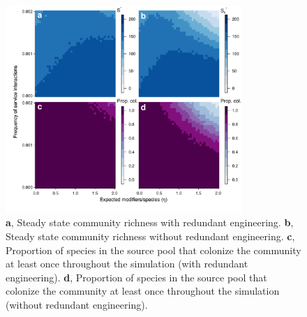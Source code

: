 \documentclass[twocolumn,preprintnumbers,amsmath,amssymb,superscriptaddress,linenumbers]{revtex4-1}
\begin{document}
\begin{figure}[h!]
\centering
\includegraphics[width=0.8\textwidth]{fig_steadystates2.pdf}
\caption{
\textbf{a}, Steady state community richness with redundant engineering.
\textbf{b}, Steady state community richness without redundant engineering.
\textbf{c}, Proportion of species in the source pool that colonize the community at least once throughout the simulation (with redundant engineering).
\textbf{d}, Proportion of species in the source pool that colonize the community at least once throughout the simulation (without redundant engineering).
}
\label{fig:steadystate}
\end{figure}
\end{document}
